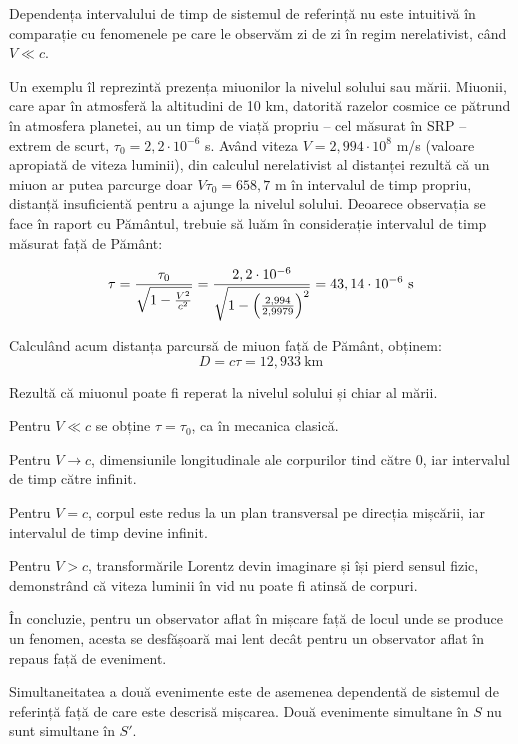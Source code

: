 \parbreak

Dependența intervalului de timp de sistemul de referință nu este intuitivă în
comparație cu fenomenele pe care le observăm zi de zi în regim nerelativist,
când \( V \ll c \).

Un exemplu îl reprezintă prezența miuonilor la nivelul solului sau mării.
Miuonii, care apar în atmosferă la altitudini de 10 km, datorită razelor
cosmice ce pătrund în atmosfera planetei, au un timp de viață propriu -- cel
măsurat în SRP -- extrem de scurt, \( \tau_0 = 2,2 \cdot 10^{-6} \) s. Având
viteza \( V = 2,994 \cdot 10^8 \) m/s (valoare apropiată de viteza luminii),
din calculul nerelativist al distanței rezultă că un miuon ar putea parcurge
doar \( V\tau_0 = 658,7 \) m în intervalul de timp propriu, distanță
insuficientă pentru a ajunge la nivelul solului.  Deoarece observația se face
în raport cu Pământul, trebuie să luăm în considerație intervalul de timp
măsurat față de Pământ:

\[
    \tau = \frac{\tau_0}{\sqrt{1 - \frac{V^2}{c^2}}}
    = \frac{2,2 \cdot 10^{-6}}{\sqrt{1 - \left( \frac{2,994}{2,9979} \right)^2}}
    = 43,14 \cdot 10^{-6} ~ \mathrm{s}
\]

Calculând acum distanța parcursă de miuon față de Pământ, obținem:
\[ D = c\tau = 12,933 ~ \mathrm{km} \]

Rezultă că miuonul poate fi reperat la nivelul solului și chiar al mării.

\pagebreak

Pentru \( V \ll c \) se obține \( \tau = \tau_0 \), ca în mecanica clasică.

Pentru \( V \rightarrow c \), dimensiunile longitudinale ale corpurilor tind
către 0, iar intervalul de timp către infinit.

Pentru \( V = c \), corpul este redus la un plan transversal pe direcția
mișcării, iar intervalul de timp devine infinit.

Pentru \( V > c \), transformările Lorentz devin imaginare și își pierd
sensul fizic, demonstrând că viteza luminii în vid nu poate fi atinsă de
corpuri.

În concluzie, pentru un observator aflat în mișcare față de locul unde se
produce un fenomen, acesta se desfășoară mai lent decât pentru un observator
aflat în repaus față de eveniment.

Simultaneitatea a două evenimente este de asemenea dependentă de sistemul de
referință față de care este descrisă mișcarea. Două evenimente simultane în
$S$ nu sunt simultane în $S'$.

